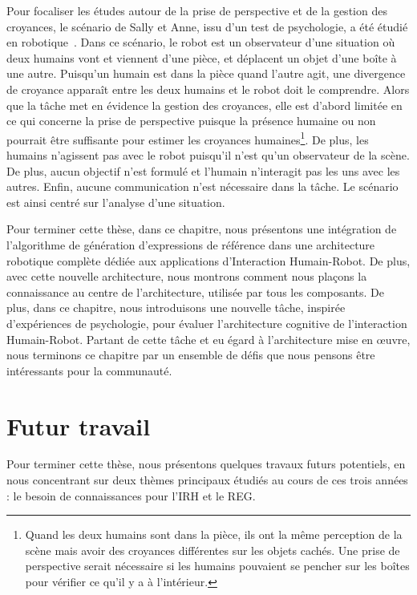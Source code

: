 Pour focaliser les études autour de la prise de perspective et de la gestion des croyances, le scénario de Sally et Anne, issu d'un test de psychologie, a été étudié en robotique~\cite{milliez_2014_framework}. Dans ce scénario, le robot est un observateur d'une situation où deux humains vont et viennent d'une pièce, et déplacent un objet d'une boîte à une autre. Puisqu'un humain est dans la pièce quand l'autre agit, une divergence de croyance apparaît entre les deux humains et le robot doit le comprendre. Alors que la tâche met en évidence la gestion des croyances, elle est d'abord limitée en ce qui concerne la prise de perspective puisque la présence humaine ou non pourrait être suffisante pour estimer les croyances humaines\footnote{Quand les deux humains sont dans la pièce, ils ont la même perception de la scène mais avoir des croyances différentes sur les objets cachés. Une prise de perspective serait nécessaire si les humains pouvaient se pencher sur les boîtes pour vérifier ce qu'il y a à l'intérieur.}. De plus, les humains n'agissent pas avec le robot puisqu'il n'est qu'un observateur de la scène. De plus, aucun objectif n'est formulé et l'humain n'interagit pas les uns avec les autres. Enfin, aucune communication n'est nécessaire dans la tâche. Le scénario est ainsi centré sur l'analyse d'une situation.

Pour terminer cette thèse, dans ce chapitre, nous présentons une intégration de l'algorithme de génération d'expressions de référence dans une architecture robotique complète dédiée aux applications d'Interaction Humain-Robot. De plus, avec cette nouvelle architecture, nous montrons comment nous plaçons la connaissance au centre de l'architecture, utilisée par tous les composants. De plus, dans ce chapitre, nous introduisons une nouvelle tâche, inspirée d'expériences de psychologie, pour évaluer l'architecture cognitive de l'interaction Humain-Robot. Partant de cette tâche et eu égard à l'architecture mise en œuvre, nous terminons ce chapitre par un ensemble de défis que nous pensons être intéressants pour la communauté.

\section*{Futur travail}

Pour terminer cette thèse, nous présentons quelques travaux futurs potentiels, en nous concentrant sur deux thèmes principaux étudiés au cours de ces trois années : le besoin de connaissances pour l'IRH et le REG.

